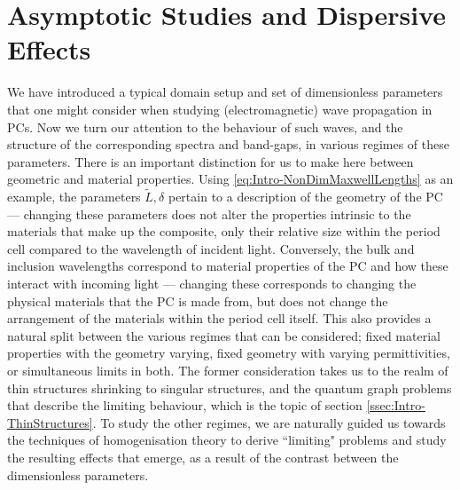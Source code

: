 \section{Asymptotic Studies and Dispersive Effects} \label{sec:AsymptoticStudies}
We have introduced a typical domain setup and set of dimensionless parameters that one might consider when studying (electromagnetic) wave propagation in PCs.
Now we turn our attention to the behaviour of such waves, and the structure of the corresponding spectra and band-gaps, in various regimes of these parameters.
There is an important distinction for us to make here between geometric and material properties.
Using \eqref{eq:Intro-NonDimMaxwellLengths} as an example, the parameters $\tilde{L}, \delta$ pertain to a description of the geometry of the PC --- changing these parameters does not alter the properties intrinsic to the materials that make up the composite, only their relative size within the period cell compared to the wavelength of incident light.
Conversely, the bulk and inclusion wavelengths correspond to material properties of the PC and how these interact with incoming light --- changing these corresponds to changing the physical materials that the PC is made from, but does not change the arrangement of the materials within the period cell itself.
This also provides a natural split between the various regimes that can be considered; fixed material properties with the geometry varying, fixed geometry with varying permittivities, or simultaneous limits in both.
The former consideration takes us to the realm of thin structures shrinking to singular structures, and the quantum graph problems that describe the limiting behaviour, which is the topic of section \ref{ssec:Intro-ThinStructures}.
To study the other regimes, we are naturally guided us towards the techniques of homogenisation theory to derive ``limiting" problems and study the resulting effects that emerge, as a result of the contrast between the dimensionless parameters.






